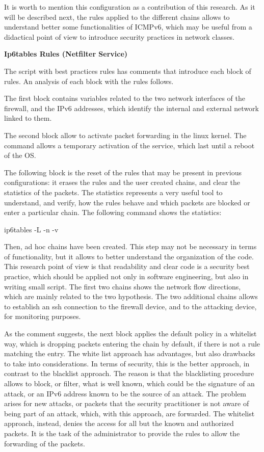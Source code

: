 \documentclass[12pt]{article}
\begin{document}
It is worth to mention this configuration as a contribution of this research. As it will be described next, the rules applied to the different chains allows to understand better some functionalities of ICMPv6, which may be useful from a didactical point of view to introduce security practices in network classes.

\textbf{Ip6tables Rules (Netfilter Service)}

The script with best practices rules has comments that introduce each block of rules. An analysis of each block with the rules follows.

The first block contains variables related to the two network interfaces of the firewall, and the IPv6 addresses, which identify the internal and external network linked to them.

The second block allow to activate packet forwarding in the linux kernel. The command allows a temporary activation of the service, which last until a reboot of the OS.

The following block is the reset of the rules that may be present in previous configurations: it erases the rules and the user created chains, and clear the statistics of the packets. The statistics represents a very useful tool to understand, and verify, how the rules behave and which packets are blocked or enter a particular chain. The following command shows the statistics:

ip6tables -L -n -v

Then, ad hoc chains have been created. This step may not be necessary in terms of functionality, but it allows to better understand the organization of the code. This research point of view is that readability and clear code is a security best practice, which should be applied not only in software engineering, but also in writing small script. The first two chains shows the network flow directions, which are mainly related to the two hypothesis. The two additional chains allows to establish an ssh connection to the firewall device, and to the attacking device, for monitoring purposes.

As the comment suggests, the next block applies the default policy in a whitelist way, which is dropping packets entering the chain by default, if there is not a rule matching the entry. The white list approach has advantages, but also drawbacks to take into considerations. In terms of security, this is the better approach, in contrast to the blacklist approach. The reason is that the blacklisting procedure allows to block, or filter, what is well known, which could be the signature of an attack, or an IPv6 address known to be the source of an attack. The problem arises for new attacks, or packets that the security practitioner is not aware of being part of an attack, which, with this approach, are forwarded. The whitelist approach, instead, denies the access for all but the known and authorized packets. It is the task of the administrator to provide the rules to allow the forwarding of the packets.
\end{document}

